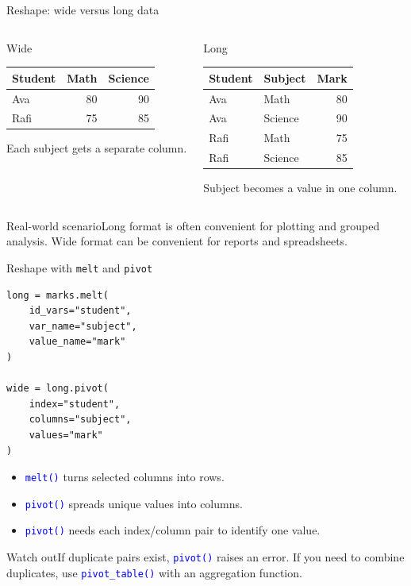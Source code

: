 \documentclass[aspectratio=169,10pt]{beamer}
\newcommand{\scenario}[1]{\begin{block}{Real-world scenario}#1\end{block}}
\newcommand{\pitfall}[1]{\begin{alertblock}{Watch out}#1\end{alertblock}}
\newcommand{\method}[1]{\texttt{\textcolor{Blue}{#1}}}
\begin{document}
\begin{frame}[fragile]{Reshape: wide versus long data}
\begin{columns}[T,onlytextwidth]
\begin{block}{Wide}
\begin{tabular}{lrr}
\toprule
Student & Math & Science\\
\midrule
Ava & 80 & 90\\
Rafi & 75 & 85\\
\bottomrule
\end{tabular}
\small Each subject gets a separate column.
\end{block}
\begin{block}{Long}
\begin{tabular}{llr}
\toprule
Student & Subject & Mark\\
\midrule
Ava & Math & 80\\
Ava & Science & 90\\
Rafi & Math & 75\\
Rafi & Science & 85\\
\bottomrule
\end{tabular}
\small Subject becomes a value in one column.
\end{block}
\end{columns}
\scenario{Long format is often convenient for plotting and grouped analysis. Wide format can be convenient for reports and spreadsheets.}
\end{frame}

\begin{frame}[fragile]{Reshape with \texttt{melt} and \texttt{pivot}}
\begin{lstlisting}
long = marks.melt(
    id_vars="student",
    var_name="subject",
    value_name="mark"
)

wide = long.pivot(
    index="student",
    columns="subject",
    values="mark"
)
\end{lstlisting}
\begin{itemize}
\item \method{melt()} turns selected columns into rows.
\item \method{pivot()} spreads unique values into columns.
\item \method{pivot()} needs each index/column pair to identify one value.
\end{itemize}
\pitfall{If duplicate pairs exist, \method{pivot()} raises an error. If you need to combine duplicates, use \method{pivot\_table()} with an aggregation function.}
\end{frame}
\end{document}
